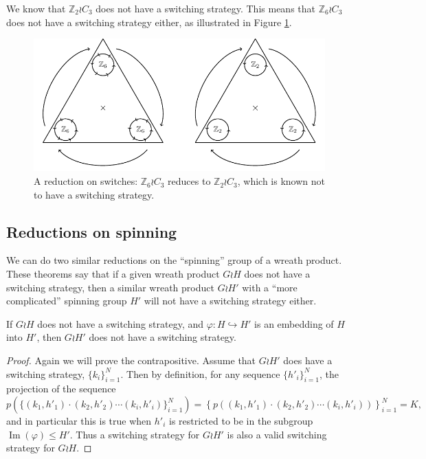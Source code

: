 \begin{example}
  We know that $\mathbb Z_2 \wr C_3$ does not have a switching strategy.
  This means that $\mathbb Z_6 \wr C_3$ does not have a switching strategy either,
  as illustrated in Figure \ref{fig:Z2C3}.
  \begin{figure}
    \center
    \includegraphics{assets/tikz_Z2C3.pdf}
    \caption[A reduction from a six-way switch to a two-way switch]{
      A reduction on switches:
      $\mathbb Z_6 \wr C_3$ reduces to $\mathbb Z_2 \wr C_3$,
      which is known not to have a switching strategy.
    }
    \label{fig:Z2C3}
  \end{figure}
\end{example}
\subsection{Reductions on spinning}
We can do two similar reductions on the ``spinning'' group of a wreath product.
These theorems say that if a given wreath product $G \wr H$ does not have a
switching strategy, then a similar wreath product $G \wr H'$ with a
``more complicated'' spinning group $H'$ will not have a switching strategy
either.
\begin{theorem}
  If $G \wr H$ does not have a switching strategy,
  and $\varphi \colon H \hookrightarrow H'$ is an embedding of $H$ into $H'$,
  then $G \wr H'$ does not have a switching strategy.
  \label{thm:SpinReduction}
\end{theorem}
\begin{proof}
  Again we will prove the contrapositive.
  Assume that $G \wr H'$ does have a switching strategy,
  $\{k_i\}_{i=1}^N$. Then by definition, for any sequence
  $\{h'_i\}_{i=1}^N$, the projection of the sequence \begin{equation}
    p(\{(k_1, h'_1)\cdot(k_2, h'_2)\cdots(k_i, h'_i)\}_{i=1}^N)
    = \left\{p\left((k_1, h'_1)\cdot(k_2, h'_2)\cdots(k_i, h'_i)\right)\right\}_{i=1}^N
    = K,
  \end{equation} and in particular this is true when $h'_i$ is restricted to be
  in the subgroup $\operatorname{Im}(\varphi) \leq H'$.
  Thus a switching strategy for $G \wr H'$ is also a valid switching strategy
  for $G \wr H$.
\end{proof}

